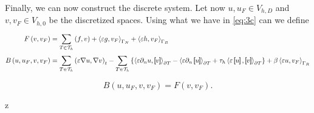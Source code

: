 Finally, we can now construct the discrete system. Let now $u, u_{F} \in V_{h,D}$ and $v, v_{F} \in V_{h,0}$ be the
discretized spaces. Using what we have in \eqref{eq:3c} can we define \[
    \begin{split}
F\left( v, v_{F} \right) & =  \sum_{T
\in \mathcal{T} _{h}}^{} \left( f,v \right)  + \left<\varepsilon g, v_{F} \right>_{\Gamma _{N}} + \left<\varepsilon h,
v_{F} \right>_{\Gamma _{R}} \\
B\left( u, u_{F} , v, v_{F} \right)  &=
    \sum_{T \in \mathcal{T} _{h}}^{}   \left( \varepsilon \nabla u, \nabla v \right) _{t} -\sum_{T \in \mathcal{T} _{h}}^{}
\left\{ \left<\varepsilon  \partial
_{n} u , \jump{ v } \right> _{\partial T}  -\left<\varepsilon
\partial _{n} \jump{u} \right>_{\partial T}  + \tau _{h} \left<\varepsilon \jump{u},
\jump{v} \right>_{\partial T} \right\}  + \beta  \left< \varepsilon u, v_{F}  \right>_{\Gamma _{R}} \\
    \end{split}
\]

\begin{equation}
\label{eq:3f }
B\left( u, u_{F} , v, v_{F} \right) = F\left( v, v_{F} \right)
.\end{equation}






z
